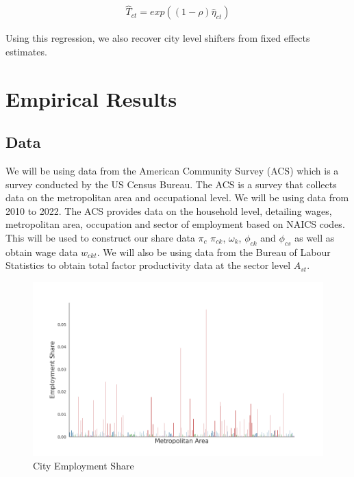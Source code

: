 \documentclass[10pt]{article}
\begin{document}
\begin{align*}
    \hat{T}_{ct} = exp \left( (1 - \rho) \hat{\eta}_{ct} \right)
\end{align*}

Using this regression, we also recover city level shifters from fixed effects estimates.

\section{Empirical Results}

\subsection{Data}

We will be using data from the American Community Survey (ACS) which is a survey conducted by the US Census Bureau. The ACS is a survey that collects data on the metropolitan area and occupational level. We will be using data from 2010 to 2022. The ACS provides data on the household level, detailing wages, metropolitan area, occupation and sector of employment based on NAICS codes. This will be used to construct our share data $\pi_c$ $\pi_{ck}$, $\omega_k$, $\phi_{ck}$ and $\phi_{cs}$ as well as obtain wage data $w_{ckt}$. We will also be using data from the Bureau of Labour Statistics to obtain total factor productivity data at the sector level $A_{st}$.

\begin{figure}[!htb]
    \centering
    \includegraphics[width=\textwidth]{../../estimations/graphs/city_employment_share.png}
    \caption{City Employment Share}
    \label{employment_city_share}
\end{figure}
\end{document}
